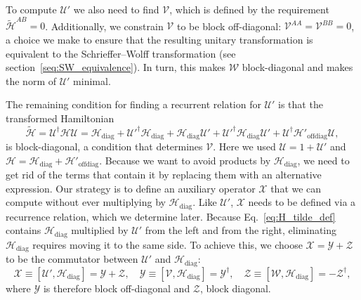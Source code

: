 To compute $\mathcal{U}'$ we also need to find $\mathcal{V}$, which is defined by the requirement $\tilde{\mathcal{H}}^{AB} = 0$.
Additionally, we constrain $\mathcal{V}$ to be block off-diagonal: $\mathcal{V}^{AA} = \mathcal{V}^{BB} = 0$, a choice we make to ensure that the resulting unitary transformation is equivalent to the Schrieffer--Wolff transformation (see section~\ref{seq:SW_equivalence}).
In turn, this makes $\mathcal{W}$ block-diagonal and makes the norm of $\mathcal{U}'$ minimal.

The remaining condition for finding a recurrent relation for $\mathcal{U}'$ is that the transformed Hamiltonian
%
\begin{equation}
\label{eq:H_tilde_def}
\tilde{\mathcal{H}} = \mathcal{U}^\dagger \mathcal{H} \mathcal{U} = \mathcal{H}_\textrm{diag} +
\mathcal{U}'^\dagger \mathcal{H}_\textrm{diag} + \mathcal{H}_\textrm{diag} \mathcal{U}' + \mathcal{U}'^\dagger \mathcal{H}_\textrm{diag}
\mathcal{U}' + \mathcal{U}^\dagger\mathcal{H}'_\textrm{offdiag}\mathcal{U},
\end{equation}
%
is block-diagonal, a condition that determines $\mathcal{V}$.
Here we used $\mathcal{U}=1+\mathcal{U}'$ and $\mathcal{H} = \mathcal{H}_\textrm{diag} + \mathcal{H}'_\textrm{offdiag}$.
Because we want to avoid products by $\mathcal{H}_\textrm{diag}$, we need to get rid of the terms that contain it by replacing them with an alternative expression.
Our strategy is to define an auxiliary operator $\mathcal{X}$ that we can compute without ever multiplying by $\mathcal{H}_\textrm{diag}$.
Like $\mathcal{U}'$, $\mathcal{X}$ needs to be defined via a recurrence relation, which we determine later.
Because Eq.~\eqref{eq:H_tilde_def} contains $\mathcal{H}_\textrm{diag}$ multiplied by $\mathcal{U}'$ from the left and from the right, eliminating $\mathcal{H}_\textrm{diag}$ requires moving it to the same side.
To achieve this, we choose $\mathcal{X}=\mathcal{Y}+\mathcal{Z}$ to be the commutator between $\mathcal{U}'$ and $\mathcal{H}_\textrm{diag}$:
%
\begin{equation}
\label{eq:XYZ}
\mathcal{X} \equiv [\mathcal{U}', \mathcal{H}_\textrm{diag}] = \mathcal{Y} + \mathcal{Z}, \quad
\mathcal{Y} \equiv [\mathcal{V}, \mathcal{H}_\textrm{diag}] = \mathcal{Y}^\dagger,\quad
\mathcal{Z} \equiv [\mathcal{W}, \mathcal{H}_\textrm{diag}] = -\mathcal{Z}^\dagger,
\end{equation}
%
where $\mathcal{Y}$ is therefore block off-diagonal and $\mathcal{Z}$, block diagonal.
